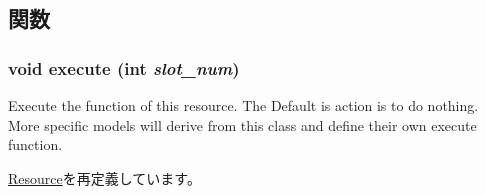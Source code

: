 \subsection{関数}
\hypertarget{classExecutionUnit_a7b7fff82f8c9cbdb02add1346f60bb9e}{
\subsubsection[{execute}]{\setlength{\rightskip}{0pt plus 5cm}void execute (int {\em slot\_\-num})}}
\label{classExecutionUnit_a7b7fff82f8c9cbdb02add1346f60bb9e}
Execute the function of this resource. The Default is action is to do nothing. More specific models will derive from this class and define their own execute function. 

\hyperlink{classResource_a39af49c5568d1db3f53c12d7d6914c32}{Resource}を再定義しています。


